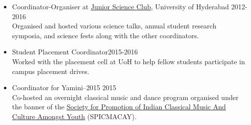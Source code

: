 \begin{itemize}[noitemsep]
\item {Coordinator-Organiser} at \href{https://www.facebook.com/jscuoh/?ref=br_rs}{Junior Science Club}, University of Hyderabad \hfill 2012-2016\\
Organised and hosted various science talks, annual student research symposia, and science fests along with the other coordinators.

\item {Student Placement Coordinator}\hfill 2015-2016\\
Worked with the placement cell at UoH to help fellow students participate in campus placement drives.

\item Coordinator for Yamini–2015 \hfill 2015\\
Co-hosted an overnight classical music and dance program organised under the banner of the \href{http://www.spicmacay.com}{Society for Promotion of Indian Classical Music And Culture Amongst Youth} (SPICMACAY).
\end{itemize}

\vspace{-0.4cm}